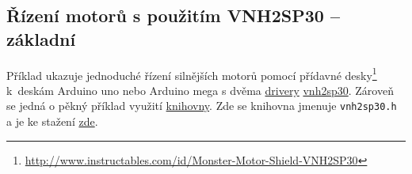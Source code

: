 \label{prog:vnh2sp30} \label{prog:knihovna} 
\subsection{Řízení motorů s použitím VNH2SP30 -- základní} 

Příklad ukazuje jednoduché řízení silnějších motorů pomocí přídavné 
desky\footnote{\url{http://www.instructables.com/id/Monster-Motor-Shield-VNH2SP30}
	} k~deskám Arduino uno nebo Arduino mega  s dvěma \hyperref[driver]{drivery}
  \hyperref[vnh2sp30]{vnh2sp30}.  Zároveň se jedná o pěkný příklad využití \hyperref[knihovna]{knihovny}. Zde se knihovna jmenuje {\tt vnh2sp30.h} a je ke stažení 
  \href{https://github.com/RoboticsBrno/RoboticsBrno-guides/tree/RoboticsManual/RoboticsManual/priklady_c}{zde}.






